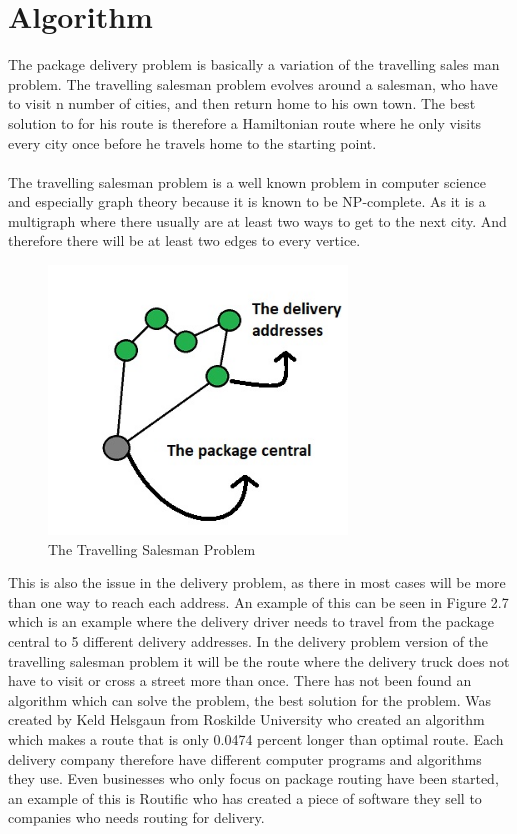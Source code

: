\documentclass[12pt]{report}
\begin{document}
\section{Algorithm}
The package delivery problem is basically a variation of the travelling sales man problem. The travelling salesman problem evolves around a salesman, who have to visit n number of cities, and then return home to his own town. The best solution to for his route is therefore a Hamiltonian route where he only visits every city once before he travels home to the starting point. \\ \\
The travelling salesman problem is a well known problem in computer science and especially graph theory because it is known to be NP-complete. As it is a multigraph where there usually are at least two ways to get to the next city. And therefore there will be at least two edges to every vertice.\cite{tsp} 

\begin{figure}[H]
  \centering
  \includegraphics[width=300]{pics/tsp.jpg}
  \caption{The Travelling Salesman Problem}
  \label{fig: The Travelling Salesman Problem}
\end{figure}\textbf{}

This is also the issue in the delivery problem, as there in most cases will be more than one way to reach each address. An example of this can be seen in Figure 2.7 which is an example where the delivery driver needs to travel from the package central to 5 different delivery addresses. In the delivery problem version of the travelling salesman problem it will be the route where the delivery truck does not have to visit or cross a street more than once\cite{tsp}. There has not been found an algorithm which can solve the problem, the best solution for the problem. Was created by Keld Helsgaun from Roskilde University\cite{keld} who created an algorithm which makes a route that is only 0.0474 percent longer than optimal route\cite{tsp2}. Each delivery company therefore have different computer programs and algorithms they use. Even businesses who only focus on package routing have been started, an example of this is Routific who has created a piece of software they sell to companies who needs routing for delivery\cite{routific}.         
\end{document}
